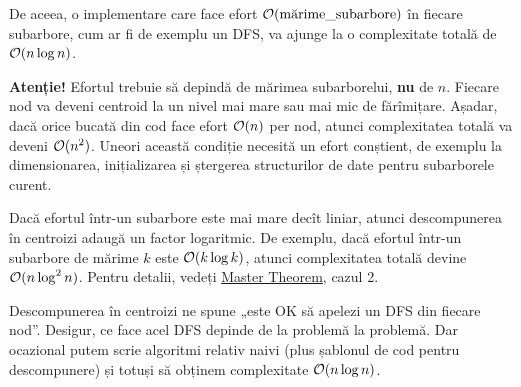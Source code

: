\documentclass[../main.tex]{subfiles}
\begin{document}
De aceea, o implementare care face efort $\mathcal{O}(\textrm{mărime\_subarbore})$ în fiecare subarbore, cum ar fi de exemplu un DFS, va ajunge la o complexitate totală de $\mathcal{O}(n \log n)$.

\textbf{Atenție!} Efortul trebuie să depindă de mărimea subarborelui, \textbf{nu} de $n$. Fiecare nod va deveni centroid la un nivel mai mare sau mai mic de fărîmițare. Așadar, dacă orice bucată din cod face efort $\mathcal{O}(n)$ per nod, atunci complexitatea totală va deveni $\mathcal{O}(n^2)$. Uneori această condiție necesită un efort conștient, de exemplu la dimensionarea, inițializarea și ștergerea structurilor de date pentru subarborele curent.

Dacă efortul într-un subarbore este mai mare decît liniar, atunci descompunerea în centroizi adaugă un factor logaritmic. De exemplu, dacă efortul într-un subarbore de mărime $k$ este $\mathcal{O}(k \log k)$, atunci complexitatea totală devine $\mathcal{O}(n \log^2 n)$. Pentru detalii, vedeți \href{https://en.wikipedia.org/wiki/Master\_theorem\_(analysis\_of\_algorithms)}{Master Theorem}, cazul 2.

Descompunerea în centroizi ne spune „este OK să apelezi un DFS din fiecare nod”. Desigur, ce face acel DFS depinde de la problemă la problemă. Dar ocazional putem scrie algoritmi relativ naivi (plus șablonul de cod pentru descompunere) și totuși să obținem complexitate $\mathcal{O}(n \log n)$.
\end{document}
